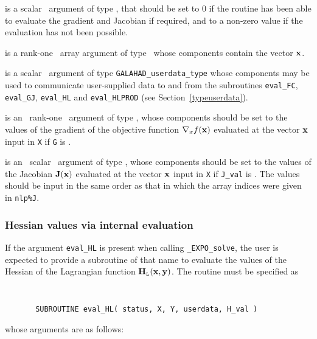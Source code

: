 \documentclass{galahad}
\newcommand{\packagename}{EXPO}
\newcommand{\fullpackagename}{\libraryname\_\packagename}
\newcommand{\solver}{{\tt \fullpackagename\_solve}}
\newcommand{\bmHL}{\bmH\sub{L}}
\begin{document}
\begin{description}
 is a scalar \intentout\ argument of type \integer,
that should be set to 0 if the routine has been able to evaluate
the gradient and Jacobian if required,
and to a non-zero value if the evaluation has not been possible.

 is a rank-one \intentin\ array argument of type \realdp\
whose components contain the vector ${\mathbf{x}}$.

 is a scalar \intentinout\ argument of type
{\tt GALAHAD\_userdata\_type} whose components may be used
to communicate user-supplied data to and from the
subroutines {\tt eval\_FC}, {\tt eval\_GJ},
{\tt eval\_HL} and {\tt eval\_HLPROD}
(see Section~\ref{typeuserdata}).

 is an \optional\ rank-one \intentout\ argument of type \realdp,
whose components should be set to the values of the gradient
of the objective function $\nabla_x f({\mathbf{x}})$
evaluated at the vector ${\mathbf{x}}$ input in {\tt X} if {\tt G} is \present.

 is an \optional\ scalar \intentout\ argument of type \realdp,
whose components should be set to the values of the Jacobian ${\mathbf{J}}({\mathbf{x}})$
evaluated at the vector ${\mathbf{x}}$ input in {\tt X} if {\tt J\_val} is \present.
The values should be input in the same order as that in which the array 
indices were given in {\tt nlp\%J}.

\end{description}


\subsubsection{Hessian values via internal evaluation\label{hfv}}

If the argument {\tt eval\_HL} is present when calling \solver, the
user is expected to provide a subroutine of that name to evaluate the
values of the Hessian of the Lagrangian function $\bmHL(\bmx,\bmy)$.
The routine must be specified as

\def\baselinestretch{0.8}
{\tt
\begin{verbatim}
       SUBROUTINE eval_HL( status, X, Y, userdata, H_val )
\end{verbatim} }
\def\baselinestretch{1.0}
\noindent whose arguments are as follows:
\end{document}
